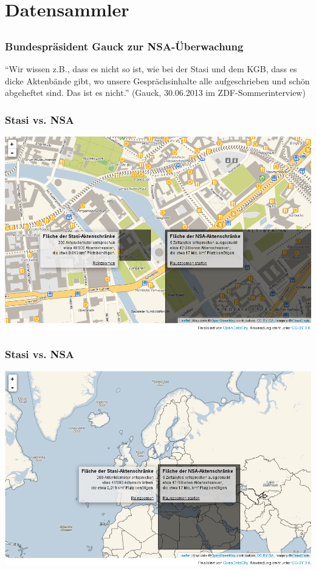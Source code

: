 \documentclass[12pt]{beamer}
\begin{document}
\section{Datensammler}
\subsection{}

\begin{frame}
    \frametitle{Bundespräsident Gauck zur NSA-Überwachung}
    \begin{center}
      ``Wir wissen z.B., dass es nicht so ist, wie bei der Stasi und dem KGB, dass es dicke Aktenbände gibt, wo unsere Gesprächsinhalte alle aufgeschrieben und schön abgeheftet sind. Das ist es nicht.''
      (Gauck, 30.06.2013 im ZDF-Sommerinterview)
    \end{center}
\end{frame}

\begin{frame}
    \frametitle{Stasi vs. NSA}
    \begin{center}
	\includegraphics[height=0.7\textheight]{img/akten1.png}
    \end{center}
\end{frame}

\begin{frame}
    \frametitle{Stasi vs. NSA}
    \begin{center}
	\includegraphics[height=0.7\textheight]{img/akten2.png}
    \end{center}
\end{frame}
\end{document}
